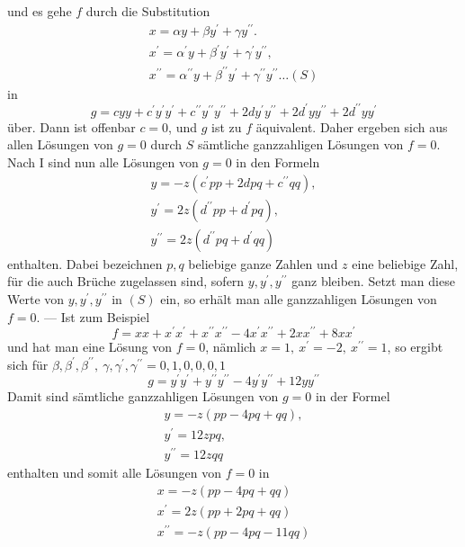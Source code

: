 und es gehe \(f\) durch die Substitution
\[\begin{gathered}x=\alpha y+\beta y^\prime+\gamma y^{\prime\prime}.\\ x^\prime=\alpha^\prime y+\beta^\prime y^\prime+\gamma^\prime y^{\prime\prime},\\ x^{\prime\prime}=\alpha^{\prime\prime}y+\beta^{\prime\prime}y^\prime+\gamma^{\prime\prime}y^{\prime\prime}\ldots(S)\end{gathered}\]
in
\[g=cyy+c^\prime y^\prime y^\prime+c^{\prime\prime}y^{\prime\prime}y^{\prime\prime}+2dy^\prime y^{\prime\prime}+2d^\prime yy^{\prime\prime}+2d^{\prime\prime}yy^\prime\]
über. Dann ist offenbar \(c=0\), und \(g\) ist zu \(f\) äquivalent. Daher ergeben sich aus allen Lösungen von \(g=0\) durch \(S\) sämtliche ganzzahligen Lösungen von \(f=0\). Nach I sind nun alle Lösungen von \(g=0\) in den Formeln
\[\begin{gathered}y=-z(c^\prime pp+2dpq+c^{\prime\prime}qq),\\ y^\prime=2z(d^{\prime\prime}pp+d^\prime pq),\\ y^{\prime\prime}=2z(d^{\prime\prime}pq+d^\prime qq)\end{gathered}\]
enthalten. Dabei bezeichnen \(p,q\) beliebige ganze Zahlen und \(z\) eine beliebige Zahl, für die auch Brüche zugelassen sind, sofern \(y,y^\prime,y^{\prime\prime}\) ganz bleiben. Setzt man diese Werte von \(y,y^\prime,y^{\prime\prime}\) in \((S)\) ein, so erhält man alle ganzzahligen Lösungen von \(f=0\). — Ist zum Beispiel
\[f=xx+x^\prime x^\prime+x^{\prime\prime}x^{\prime\prime}-4x^\prime x^{\prime\prime}+2xx^{\prime\prime}+8xx^\prime\]
und hat man eine Lösung von \(f=0\), nämlich \(x=1,\ x^\prime=-2,\ x^{\prime\prime}=1\), so ergibt sich für \(\beta,\beta^\prime,\beta^{\prime\prime},\ \gamma,\gamma^\prime,\gamma^{\prime\prime}=0,1,0,0,0,1\)
\[g=y^\prime y^\prime+y^{\prime\prime}y^{\prime\prime}-4y^\prime y^{\prime\prime}+12yy^{\prime\prime}\]
Damit sind sämtliche ganzzahligen Lösungen von \(g=0\) in der Formel
\[\begin{gathered}y=-z(pp-4pq+qq),\\ y^\prime=12zpq,\\ y^{\prime\prime}=12zqq\end{gathered}\]
enthalten und somit alle Lösungen von \(f=0\) in
\[\begin{gathered}x=-z(pp-4pq+qq)\\x^\prime=2z(pp+2pq+qq)\\x^{\prime\prime}=-z(pp-4pq-11qq)\end{gathered}\]


